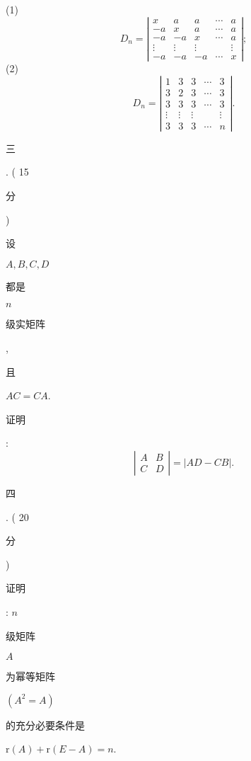 \documentclass[10pt]{article}
\begin{document}
(1)
$$
D_{n}=\left|\begin{array}{ccccc}
x & a & a & \cdots & a \\
-a & x & a & \cdots & a \\
-a & -a & x & \cdots & a \\
\vdots & \vdots & \vdots & & \vdots \\
-a & -a & -a & \cdots & x
\end{array}\right| ;
$$
(2)
$$
D_{n}=\left|\begin{array}{ccccc}
1 & 3 & 3 & \cdots & 3 \\
3 & 2 & 3 & \cdots & 3 \\
3 & 3 & 3 & \cdots & 3 \\
\vdots & \vdots & \vdots & & \vdots \\
3 & 3 & 3 & \cdots & n
\end{array}\right| .
$$
\begin{CJK}{UTF8}{mj}三\end{CJK}. ( 15 \begin{CJK}{UTF8}{mj}分\end{CJK}) \begin{CJK}{UTF8}{mj}设\end{CJK} $A, B, C, D$ \begin{CJK}{UTF8}{mj}都是\end{CJK} $n$ \begin{CJK}{UTF8}{mj}级实矩阵\end{CJK}, \begin{CJK}{UTF8}{mj}且\end{CJK} $A C=C A$. \begin{CJK}{UTF8}{mj}证明\end{CJK}:
$$
\left|\begin{array}{ll}
A & B \\
C & D
\end{array}\right|=|A D-C B| .
$$
\begin{CJK}{UTF8}{mj}四\end{CJK}. ( 20 \begin{CJK}{UTF8}{mj}分\end{CJK}) \begin{CJK}{UTF8}{mj}证明\end{CJK}: $n$ \begin{CJK}{UTF8}{mj}级矩阵\end{CJK} $A$ \begin{CJK}{UTF8}{mj}为幂等矩阵\end{CJK} $\left(A^{2}=A\right)$ \begin{CJK}{UTF8}{mj}的充分必要条件是\end{CJK} $\mathrm{r}(A)+\mathrm{r}(E-A)=n$.
\end{document}
